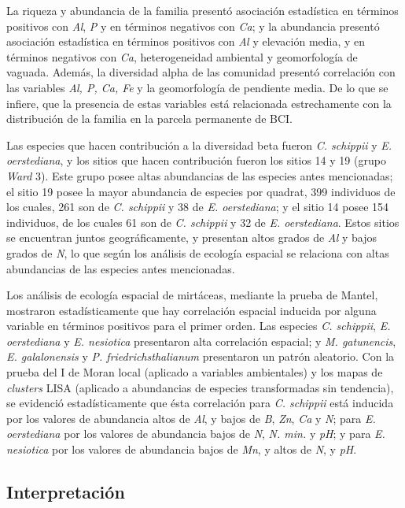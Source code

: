 \documentclass[11pt,]{article}
\begin{document}
La riqueza y abundancia de la familia presentó asociación estadística en
términos positivos con \emph{Al}, \emph{P} y en términos negativos con
\emph{Ca}; y la abundancia presentó asociación estadística en términos
positivos con \emph{Al} y elevación media, y en términos negativos con
\emph{Ca}, heterogeneidad ambiental y geomorfología de vaguada. Además,
la diversidad alpha de las comunidad presentó correlación con las
variables \emph{Al, P, Ca, Fe} y la geomorfología de pendiente media. De
lo que se infiere, que la presencia de estas variables está relacionada
estrechamente con la distribución de la familia en la parcela permanente
de BCI.

Las especies que hacen contribución a la diversidad beta fueron \emph{C.
schippii} y \emph{E. oerstediana}, y los sitios que hacen contribución
fueron los sitios 14 y 19 (grupo \emph{Ward} 3). Este grupo posee altas
abundancias de las especies antes mencionadas; el sitio 19 posee la
mayor abundancia de especies por quadrat, 399 individuos de los cuales,
261 son de \emph{C. schippii} y 38 de \emph{E. oerstediana}; y el sitio
14 posee 154 individuos, de los cuales 61 son de \emph{C. schippii} y 32
de \emph{E. oerstediana}. Estos sitios se encuentran juntos
geográficamente, y presentan altos grados de \emph{Al} y bajos grados de
\emph{N}, lo que según los análisis de ecología espacial se relaciona
con altas abundancias de las especies antes mencionadas.

Los análisis de ecología espacial de mirtáceas, mediante la prueba de
Mantel, mostraron estadísticamente que hay correlación espacial inducida
por alguna variable en términos positivos para el primer orden. Las
especies \emph{C. schippii}, \emph{E. oerstediana} y \emph{E. nesiotica}
presentaron alta correlación espacial; y \emph{M. gatunencis}, \emph{E.
galalonensis} y \emph{P. friedrichsthalianum} presentaron un patrón
aleatorio. Con la prueba del I de Moran local (aplicado a variables
ambientales) y los mapas de \emph{clusters} LISA (aplicado a abundancias
de especies transformadas sin tendencia), se evidenció estadísticamente
que ésta correlación para \emph{C. schippii} está inducida por los
valores de abundancia altos de \emph{Al}, y bajos de \emph{B},
\emph{Zn}, \emph{Ca} y \emph{N}; para \emph{E. oerstediana} por los
valores de abundancia bajos de \emph{N}, \emph{N. min.} y \emph{pH}; y
para \emph{E. nesiotica} por los valores de abundancia bajos de
\emph{Mn}, y altos de \emph{N}, y \emph{pH}.

\subsection{Interpretación}\label{interpretaciuxf3n}
\end{document}
